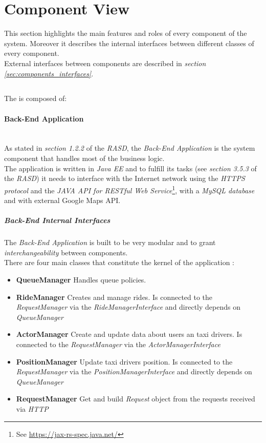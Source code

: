 \section{Component View} %
\label{sec:component_view}
This section highlights the main features and roles of every component of the system. Moreover it describes the internal interfaces between different classes of every component.\\
External interfaces between components are described in \emph{section \ref{sec:components_interfaces}}.
\subsection{} %
\label{sub:nameref_}
The  is composed of:

\paragraph{Back-End Application} %
\label{par:back_end_application}\hfill \\
As stated in \emph{section 1.2.2} of the \emph{RASD}, the \emph{Back-End Application} is the system component that handles most of the business logic.\\
The application is written in \emph{Java EE} and to fulfill its tasks (see \emph{section 3.5.3} of the \emph{RASD}) it needs to interface with the Internet network using the \emph{HTTPS protocol} and the \emph{JAVA API for RESTful Web Service}\footnote{See \url{https://jax-rs-spec.java.net/}}, with a \emph{MySQL database} and with external Google Maps API.\\

\subparagraph{Back-End Internal Interfaces}
\label{subpar:back_end_interfaces}
The \emph{Back-End Application} is built to be very modular and to grant \emph{interchangeability} between components.\\
There are four main classes that constitute the kernel of the application :
\begin{itemize}
	\item \textbf{QueueManager} Handles queue policies. 
	\item \textbf{RideManager}  Creates and manage rides. Is connected to the \emph{RequestManager} via the \emph{RideManagerInterface} and directly depends on \emph{QueueManager}
	\item \textbf{ActorManager} Create and update data about users an taxi drivers. Is connected to the \emph{RequestManager} via the \emph{ActorManagerInterface}
	\item \textbf{PositionManager} Update taxi drivers position. Is connected to the \emph{RequestManager} via the \emph{PositionManagerInterface} and directly depends on \emph{QueueManager}
	\item \textbf{RequestManager}	Get and build \emph{Request} object from the requests received via \emph{HTTP}
\end{itemize}

